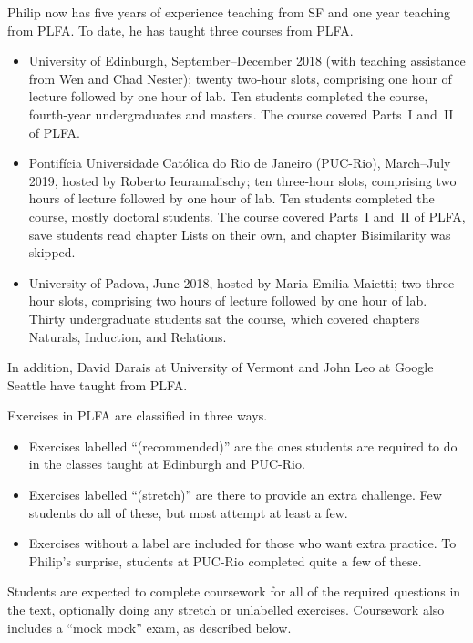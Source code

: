 \documentclass[preprint,authoryear]{elsarticle}
\begin{document}
Philip now has five years of experience teaching from SF and one year
teaching from PLFA.  To date, he has taught three courses from PLFA.
\begin{itemize}
\item
  University of Edinburgh, September--December 2018 (with teaching
  assistance from Wen and Chad Nester); twenty two-hour slots,
  comprising one hour of lecture followed by one hour of lab. Ten
  students completed the course, fourth-year undergraduates and
  masters.  The course covered Parts~I and~II of PLFA.

\item
  Pontifícia Universidade Católica do Rio de Janeiro (PUC-Rio),
  March--July 2019, hosted by Roberto Ieuramalischy; ten three-hour
  slots, comprising two hours of lecture followed by one hour of lab.
  Ten students completed the course, mostly doctoral students.  The
  course covered Parts~I and~II of PLFA, save students read chapter
  Lists on their own, and chapter Bisimilarity was skipped.

\item
  University of Padova, June 2018, hosted by Maria Emilia Maietti; two
  three-hour slots, comprising two hours of lecture followed by one
  hour of lab.  Thirty undergraduate students sat the course, which
  covered chapters Naturals, Induction, and Relations.
    
\end{itemize}
In addition, David Darais at University of Vermont and John Leo at
Google Seattle have taught from PLFA.

Exercises in PLFA are classified in three ways.
\begin{itemize}
\item
  Exercises labelled “(recommended)” are the ones students are
  required to do in the classes taught at Edinburgh and PUC-Rio.

\item
  Exercises labelled “(stretch)” are there to provide an extra
  challenge. Few students do all of these, but most attempt at least a
  few. 

\item   
  Exercises without a label are included for those who want extra
  practice.  To Philip's surprise, students at PUC-Rio completed
  quite a few of these.
\end{itemize}
Students are expected to complete coursework for all of the
required questions in the text, optionally doing any stretch or
unlabelled exercises. Coursework also includes a ``mock mock''
exam, as described below.
\end{document}
